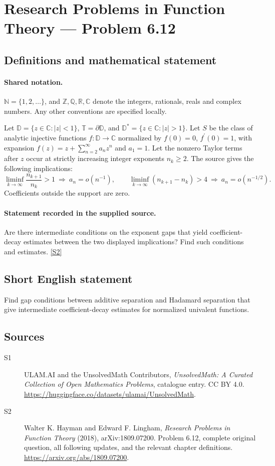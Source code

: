 \documentclass[11pt]{book}
\newcommand{\sref}[2]{\hyperlink{source:#1:#2}{[S#2]}}
\begin{document}
\section{Research Problems in Function Theory — Problem 6.12}\label{statement}

\subsection{Definitions and mathematical statement}

\paragraph{Shared notation.}$\mathbb N=\{1,2,\ldots\}$, and $\mathbb Z,\mathbb Q,\mathbb R,\mathbb C$ denote the integers, rationals, reals and complex numbers. Any other conventions are specified locally.


Let $\mathbb D=\{z\in\mathbb C:|z|<1\}$, $\mathbb T=\partial\mathbb D$, and $\mathbb D^*=\{z\in\mathbb C:|z|>1\}$. Let $S$ be the class of analytic injective functions $f:\mathbb D\to\mathbb C$ normalized by $f(0)=0$, $f^{\prime}(0)=1$, with expansion $f(z)=z+\sum_{n=2}^{\infty}a_nz^n$ and $a_1=1$. Let the nonzero Taylor terms after $z$ occur at strictly increasing integer exponents $n_k\ge2$. The source gives the following implications: \[\liminf_{k\to\infty}\frac{n_{k+1}}{n_k}>1\ \Longrightarrow\ a_n=o(n^{-1}),\qquad \liminf_{k\to\infty}(n_{k+1}-n_k)>4\ \Longrightarrow\ a_n=o(n^{-1/2}).\] Coefficients outside the support are zero.
\paragraph{Statement recorded in the supplied source.}
Are there intermediate conditions on the exponent gaps that yield coefficient-decay estimates between the two displayed implications? Find such conditions and estimates. \sref{statement}{2}
\subsection{Short English statement}
Find gap conditions between additive separation and Hadamard separation that give intermediate coefficient-decay estimates for normalized univalent functions.
\subsection{Sources}
\begin{description}
\item[\hypertarget{source:statement:1}{S1}] ULAM.AI and the UnsolvedMath Contributors, \emph{UnsolvedMath: A Curated Collection of Open Mathematics Problems}, catalogue entry. CC BY 4.0. \url{https://huggingface.co/datasets/ulamai/UnsolvedMath}.
\item[\hypertarget{source:statement:2}{S2}] Walter K. Hayman and Edward F. Lingham, \emph{Research Problems in Function Theory} (2018), arXiv:1809.07200. Problem 6.12, complete original question, all following updates, and the relevant chapter definitions. \url{https://arxiv.org/abs/1809.07200}.
\end{description}
\label{end:statement}
\end{document}
